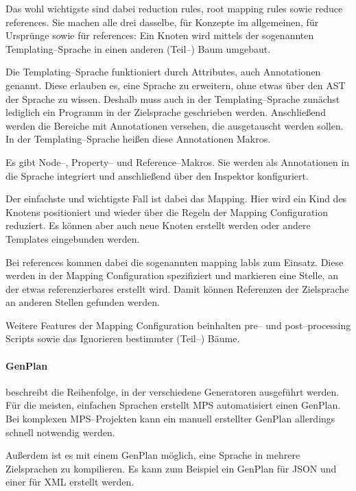 Das wohl wichtigste sind dabei {\ttfamily reduction rules}, {\ttfamily root mapping rules} sowie {\ttfamily reduce references}.
Sie machen alle drei dasselbe, für Konzepte im allgemeinen, für Ursprünge sowie für {\ttfamily references}: Ein Knoten wird mittels der sogenannten Templating--Sprache in einen anderen (Teil--) Baum umgebaut.

Die Templating--Sprache funktioniert durch Attributes, auch Annotationen genannt.
Diese erlauben es, eine Sprache zu erweitern, ohne etwas über den \ac{AST} der Sprache zu wissen.
Deshalb muss auch in der Templating--Sprache zunächst lediglich ein Programm in der Zielsprache geschrieben werden.
Anschließend werden die Bereiche mit Annotationen versehen, die ausgetauscht werden sollen.
In der Templating--Sprache heißen diese Annotationen Makros.

Es gibt Node--, Property-- und Reference--Makros.
Sie werden als Annotationen in die Sprache integriert und anschließend über den Inspektor konfiguriert.

Der einfachste und wichtigste Fall ist dabei das Mapping.
Hier wird ein Kind des Knotens positioniert und wieder über die Regeln der {\ttfamily Mapping Configuration} reduziert.
Es können aber auch neue Knoten erstellt werden oder andere Templates eingebunden werden.

Bei {\ttfamily references} kommen dabei die sogenannten {\ttfamily mapping labls} zum Einsatz.
Diese werden in der {\ttfamily Mapping Configuration} spezifiziert und markieren eine Stelle, an der etwas referenzierbares erstellt wird.
Damit können Referenzen der Zielsprache an anderen Stellen gefunden werden.

Weitere Features der {\ttfamily Mapping Configuration} beinhalten pre-- und post--processing Scripts sowie das Ignorieren bestimmter (Teil--) Bäume.

\paragraph{GenPlan} beschreibt die Reihenfolge, in der verschiedene Generatoren ausgeführt werden.
Für die meisten, einfachen Sprachen erstellt \ac{MPS} automatisiert einen GenPlan.
Bei komplexen \ac{MPS}--Projekten kann ein manuell erstellter GenPlan allerdings schnell notwendig werden.

Außerdem ist es mit einem GenPlan möglich, eine Sprache in mehrere Zielsprachen zu kompilieren.
Es kann zum Beispiel ein GenPlan für \ac{JSON} und einer für \ac{XML} erstellt werden.

